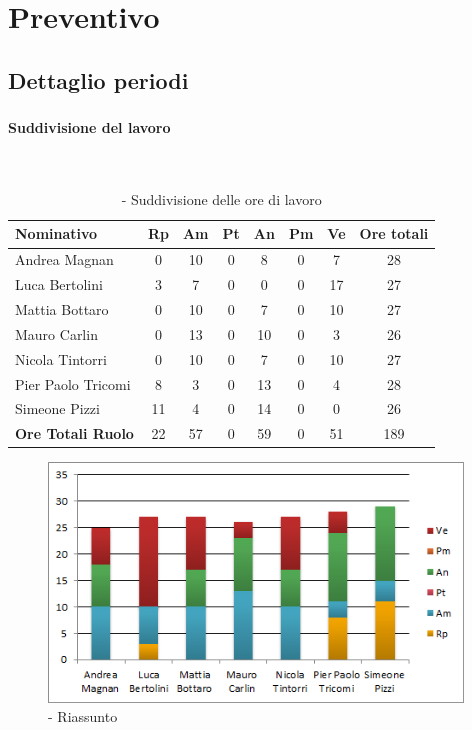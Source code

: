 \documentclass[./PianoDiProgetto.tex]{subfiles}
\begin{document}
\newpage
	\section{Preventivo}
		\subsection{Dettaglio periodi}
			\subsubsection{\PerAR}
				\paragraph{Suddivisione del lavoro}\
	\begin{table}[H]
		\begin{tabularx}{\textwidth}{l*{6}{c}c}
			\toprule
			\textbf{Nominativo} & \textbf{Rp} & \textbf{Am} & \textbf{Pt}
						& \textbf{An} & \textbf{Pm} & \textbf{Ve} & \textbf{Ore totali} \\
			\midrule
			Andrea Magnan & 0 & 10 &	0 &	8 & 0 & 7 & 28 \\
			Luca Bertolini & 3 & 7 & 0 & 0 & 0 & 17 & 27 \\
			Mattia Bottaro &	0 &	10 & 0 & 7 & 0 & 10 & 27 \\
			Mauro Carlin & 0 & 13 &	0 &	10 & 0 & 3 & 26 \\
			Nicola Tintorri &	0 & 10 & 0 & 7 & 0 & 10 & 27 \\
			Pier Paolo Tricomi & 8 & 3 &	0 &	13 & 0 & 4 & 28 \\
			Simeone Pizzi & 11 & 4 & 0 & 14 & 0 & 0 & 26 \\
			\midrule
			\textbf{Ore Totali Ruolo} & 22 & 57 & 0 & 59 &	0 &	51 & 189 \\
			\bottomrule
		\end{tabularx}
		\caption{\PerAR{} - Suddivisione delle ore di lavoro}
	\end{table}

	\vspace{15 mm}

	\begin{figure}[H]
		\centering
		\includegraphics[width=11cm, trim=1cm 0cm 1cm 0cm]{grafici/Ar-persona}
			\caption{\PerAR{} - Riassunto}
	\end{figure}
\end{document}
